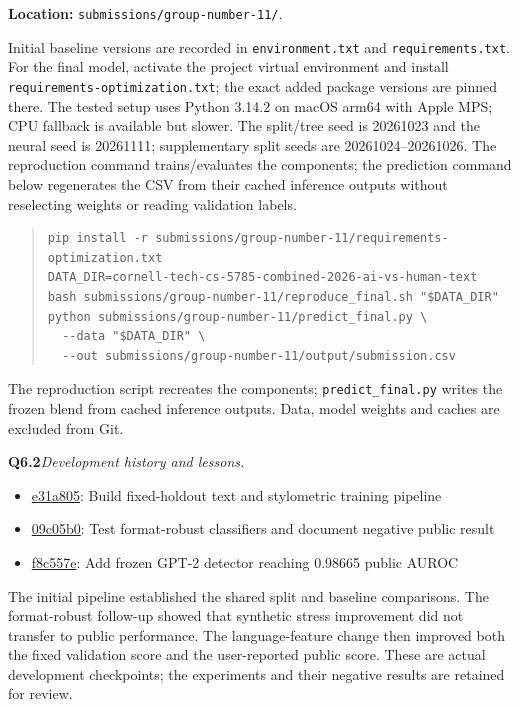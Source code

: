 \documentclass[10pt,letterpaper]{article}
\newcommand{\q}[2]{\needspace{4\baselineskip}\par\addvspace{7pt}\textbf{#1}\quad\textit{#2}\par\nobreak}
\begin{document}
\textbf{Location:} \texttt{submissions/group-number-11/}.\par
Initial baseline versions are recorded in \texttt{environment.txt} and \texttt{requirements.txt}.
For the final model, activate the project virtual environment and install \texttt{requirements-optimization.txt}; the exact added package versions are pinned there.
The tested setup uses Python 3.14.2 on macOS arm64 with Apple MPS; CPU fallback is available but slower.
The split/tree seed is 20261023 and the neural seed is 20261111; supplementary split seeds are 20261024--20261026.
The reproduction command trains/evaluates the components; the prediction command below regenerates the CSV from their cached inference outputs without reselecting weights or reading validation labels.
\begin{quote}\footnotesize\begin{verbatim}
pip install -r submissions/group-number-11/requirements-optimization.txt
DATA_DIR=cornell-tech-cs-5785-combined-2026-ai-vs-human-text
bash submissions/group-number-11/reproduce_final.sh "$DATA_DIR"
python submissions/group-number-11/predict_final.py \
  --data "$DATA_DIR" \
  --out submissions/group-number-11/output/submission.csv
\end{verbatim}\end{quote}
The reproduction script recreates the components; \texttt{predict\_final.py} writes the frozen blend from cached inference outputs. Data, model weights and caches are excluded from Git.
\q{Q6.2}{Development history and lessons.}\begin{itemize}[leftmargin=1.5em,itemsep=3pt]
\item \href{https://github.com/hisylvia66/human-or-ai-submissions/commit/e31a805}{e31a805}: Build fixed-holdout text and stylometric training pipeline
\item \href{https://github.com/hisylvia66/human-or-ai-submissions/commit/09c05b0}{09c05b0}: Test format-robust classifiers and document negative public result
\item \href{https://github.com/hisylvia66/human-or-ai-submissions/commit/f8c557e}{f8c557e}: Add frozen GPT-2 detector reaching 0.98665 public AUROC
\end{itemize}The initial pipeline established the shared split and baseline comparisons. The format-robust follow-up showed that synthetic stress improvement did not transfer to public performance. The language-feature change then improved both the fixed validation score and the user-reported public score. These are actual development checkpoints; the experiments and their negative results are retained for review.
\newpage
\end{document}
